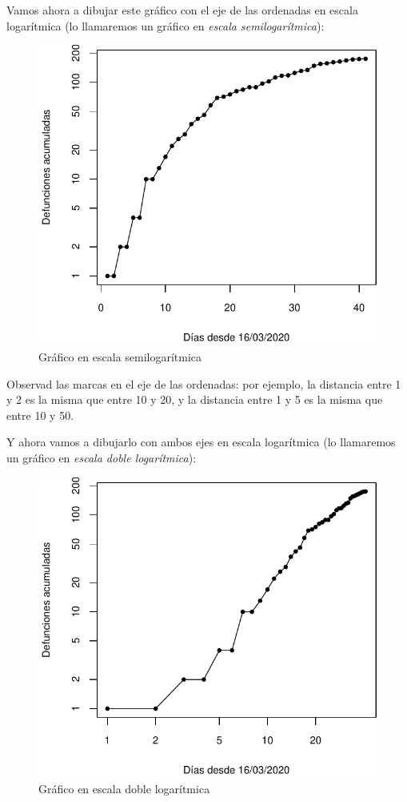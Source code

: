 \documentclass[
]{book}
\theoremstyle{definition}
\theoremstyle{definition}
\theoremstyle{definition}
\theoremstyle{definition}
\theoremstyle{remark}
\begin{document}
Vamos ahora a dibujar este gráfico con el eje de las ordenadas en escala logarítmica (lo llamaremos un gráfico en \emph{escala semilogarítmica}):

\begin{figure}

{\centering \includegraphics[width=0.5\linewidth]{INREMDN_files/figure-latex/unnamed-chunk-326-1} 

}

\caption{Gráfico en escala semilogarítmica}\label{fig:unnamed-chunk-326}
\end{figure}

Observad las marcas en el eje de las ordenadas: por ejemplo, la distancia entre 1 y 2 es la misma que entre 10 y 20, y la distancia entre 1 y 5 es la misma que entre 10 y 50.

Y ahora vamos a dibujarlo con ambos ejes en escala logarítmica (lo llamaremos un gráfico en \emph{escala doble logarítmica}):

\begin{figure}

{\centering \includegraphics[width=0.5\linewidth]{INREMDN_files/figure-latex/unnamed-chunk-327-1} 

}

\caption{Gráfico en escala doble logarítmica}\label{fig:unnamed-chunk-327}
\end{figure}
\end{document}
